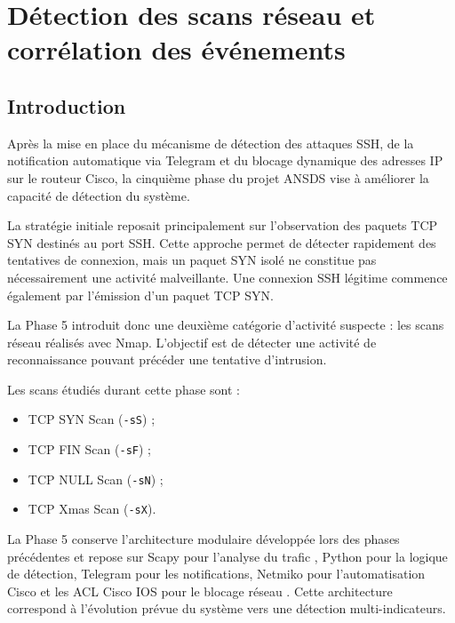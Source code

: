 \chapter{Détection des scans réseau et corrélation des événements}

\section{Introduction}

Après la mise en place du mécanisme de détection des attaques SSH, de la notification automatique via Telegram et du blocage dynamique des adresses IP sur le routeur Cisco, la cinquième phase du projet ANSDS vise à améliorer la capacité de détection du système.

La stratégie initiale reposait principalement sur l'observation des paquets TCP SYN destinés au port SSH. Cette approche permet de détecter rapidement des tentatives de connexion, mais un paquet SYN isolé ne constitue pas nécessairement une activité malveillante. Une connexion SSH légitime commence également par l'émission d'un paquet TCP SYN.

La Phase 5 introduit donc une deuxième catégorie d'activité suspecte : les scans réseau réalisés avec Nmap. L'objectif est de détecter une activité de reconnaissance pouvant précéder une tentative d'intrusion.

Les scans étudiés durant cette phase sont :

\begin{itemize}

\item TCP SYN Scan (\texttt{-sS}) ;

\item TCP FIN Scan (\texttt{-sF}) ;

\item TCP NULL Scan (\texttt{-sN}) ;

\item TCP Xmas Scan (\texttt{-sX}).

\end{itemize}

La Phase 5 conserve l'architecture modulaire développée lors des phases précédentes et repose sur Scapy pour l'analyse du trafic \cite{scapy_docs}, Python pour la logique de détection, Telegram pour les notifications, Netmiko pour l'automatisation Cisco et les ACL Cisco IOS pour le blocage réseau \cite{netmiko_docs,cisco_ios}. Cette architecture correspond à l'évolution prévue du système vers une détection multi-indicateurs.

